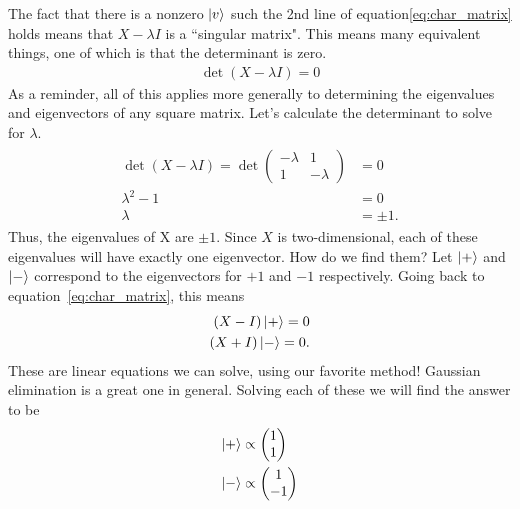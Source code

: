 \documentclass{book}
\begin{document}
    The fact that there is a nonzero $\ket{v}$ such the 2nd line of equation\eqref{eq:char_matrix} holds means that $X - \lambda I$ is a ``singular matrix". This means many equivalent things, one of which is that the determinant is zero.
    \begin{align}
        \det (X - \lambda I) = 0
    \end{align}
    As a reminder, all of this applies more generally to determining the eigenvalues and eigenvectors of any square matrix. Let's calculate the determinant to solve for $\lambda$.
    \begin{align}
    \begin{aligned}
        \det (X - \lambda I) = \det \begin{pmatrix}
            -\lambda & 1 \\
            1 & -\lambda
        \end{pmatrix} &= 0 \\
        \lambda^2 - 1 &= 0 \\
        \lambda &= \pm 1.
    \end{aligned}
    \end{align}
    Thus, the eigenvalues of X are $\pm 1$. Since $X$ is two-dimensional, each of these eigenvalues will have exactly one eigenvector. How do we find them? Let $\ket{+}$ and $\ket{-}$ correspond to the eigenvectors for $+1$ and $-1$ respectively. Going back to equation~\eqref{eq:char_matrix}, this means
    \begin{align} \label{eq:eigenvecs_X}
        (X-I)\ket{+} = 0 \\
        (X + I) \ket{-} = 0.
    \end{align}
    These are linear equations we can solve, using our favorite method! Gaussian elimination is a great one in general. Solving each of these we will find the answer to be
    \begin{align}
    \begin{aligned}
        \ket{+} &\propto \begin{pmatrix}
            1 \\ 
            1
        \end{pmatrix} \\
        \ket{-} &\propto \begin{pmatrix}
            1 \\ 
            -1
        \end{pmatrix} \\
    \end{aligned}
    \end{align}
\end{document}
